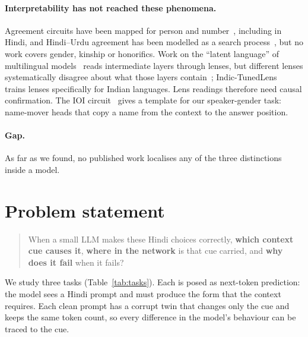 \documentclass[11pt,a4paper]{article}
\begin{document}
\paragraph{Interpretability has not reached these phenomena.}
Agreement circuits have been mapped for person and number~\cite{ferrando2024,gidi2026}, including in Hindi, and Hindi--Urdu agreement has been modelled as a search process~\cite{zhou2024}, but no work covers gender, kinship or honorifics. Work on the ``latent language'' of multilingual models~\cite{wendler2024} reads intermediate layers through lenses, but different lenses systematically disagree about what those layers contain~\cite{bayazit2026}; Indic-TunedLens~\cite{panchal2026} trains lenses specifically for Indian languages. Lens readings therefore need causal confirmation. The IOI circuit~\cite{wang2022} gives a template for our speaker-gender task: name-mover heads that copy a name from the context to the answer position.

\paragraph{Gap.} As far as we found, no published work localises any of the three distinctions inside a model.

\section{Problem statement}

\begin{quote}
When a small LLM makes these Hindi choices correctly, \textbf{which context cue causes it}, \textbf{where in the network} is that cue carried, and \textbf{why does it fail} when it fails?
\end{quote}

We study three tasks (Table~\ref{tab:tasks}). Each is posed as next-token prediction: the model sees a Hindi prompt and must produce the form that the context requires. Each clean prompt has a corrupt twin that changes only the cue and keeps the same token count, so every difference in the model's behaviour can be traced to the cue.
\end{document}
